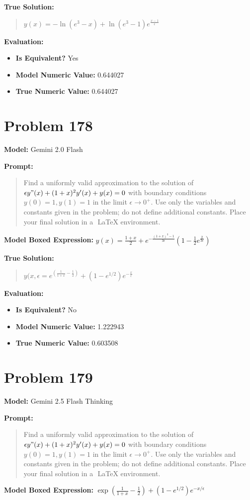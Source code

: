 \documentclass{article}
\begin{document}
{\textbf{True Solution:}
\begin{quote}
$y(x) = -\ln(e^{3}-x) + \ln(e^{3}-1)e^{\frac{x-1}{\epsilon}}$
\end{quote}

\textbf{Evaluation:}
\begin{itemize}
\item \textbf{Is Equivalent?} Yes
\item \textbf{Model Numeric Value:} 0.644027
\item \textbf{True Numeric Value:} 0.644027
\end{itemize}
\vspace{1cm}
\section*{Problem 178}
\textbf{Model:} Gemini 2.0 Flash

\textbf{Prompt:}
\begin{quote}
Find a uniformly valid approximation to the solution of $\epsilon y"(x) + (1 + x)^2 y'(x) + y(x) = 0$ with boundary conditions $y(0) = 1, y(1) = 1$ in the limit $\epsilon \to 0^+$. Use only the variables and constants given in the problem; do not define additional constants. Place your final solution in a $\boxed{}$ LaTeX environment.
\end{quote}
\textbf{Model Boxed Expression:} $y(x) = \frac{1+x}{2} + e^{-\frac{(1+x)^3-1}{3\epsilon}}\left(1 - \frac{1}{2}e^{\frac{2}{3\epsilon}}\right)$

\textbf{True Solution:}
\begin{quote}
$y(x, \epsilon = e^{(\frac{1}{1+x} - \frac{1}{2})} + (1-e^{1/2})e^{-\frac{x}{\epsilon}}$
\end{quote}

\textbf{Evaluation:}
\begin{itemize}
\item \textbf{Is Equivalent?} No
\item \textbf{Model Numeric Value:} 1.222943
\item \textbf{True Numeric Value:} 0.603508
\end{itemize}
\vspace{1cm}
\section*{Problem 179}
\textbf{Model:} Gemini 2.5 Flash Thinking

\textbf{Prompt:}
\begin{quote}
Find a uniformly valid approximation to the solution of $\epsilon y"(x) + (1 + x)^2 y'(x) + y(x) = 0$ with boundary conditions $y(0) = 1, y(1) = 1$ in the limit $\epsilon \to 0^+$. Use only the variables and constants given in the problem; do not define additional constants. Place your final solution in a $\boxed{}$ LaTeX environment.
\end{quote}
\textbf{Model Boxed Expression:} $\exp\left(\frac{1}{1+x} - \frac{1}{2}\right) + \left(1 - e^{1/2}\right)e^{-x/\epsilon}$

}
\end{document}
